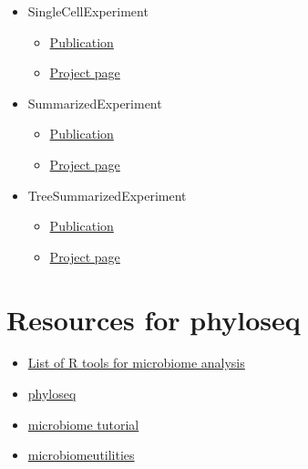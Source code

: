 \documentclass[
  oneside]{book}
\providecommand{\tightlist}{%
  \setlength{\itemsep}{0pt}\setlength{\parskip}{0pt}}
\begin{document}
\begin{itemize}
\tightlist
\item
  SingleCellExperiment

  \begin{itemize}
  \tightlist
  \item
    \href{https://bioconductor.org/packages/release/bioc/vignettes/SingleCellExperiment/inst/doc/intro.html}{Publication}
  \item
    \href{https://bioconductor.org/packages/release/bioc/html/SingleCellExperiment.html}{Project page}
  \end{itemize}
\item
  SummarizedExperiment

  \begin{itemize}
  \tightlist
  \item
    \href{https://bioconductor.org/packages/release/bioc/vignettes/SummarizedExperiment/inst/doc/SummarizedExperiment.html}{Publication}
  \item
    \href{https://bioconductor.org/packages/release/bioc/html/SummarizedExperiment.html}{Project page}
  \end{itemize}
\item
  TreeSummarizedExperiment

  \begin{itemize}
  \tightlist
  \item
    \href{https://f1000research.com/articles/9-1246}{Publication}
  \item
    \href{https://www.bioconductor.org/packages/release/bioc/html/TreeSummarizedExperiment.html}{Project page}
  \end{itemize}
\end{itemize}

\hypertarget{resources-for-phyloseq}{%
\section{Resources for phyloseq}\label{resources-for-phyloseq}}

\begin{itemize}
\tightlist
\item
  \href{https://microsud.github.io/Tools-Microbiome-Analysis/}{List of R tools for microbiome analysis}
\item
  \href{http://journals.plos.org/plosone/article?id=10.1371/journal.pone.0061217}{phyloseq}
\item
  \href{http://microbiome.github.io/tutorials/}{microbiome tutorial}
\item
  \href{https://microsud.github.io/microbiomeutilities/}{microbiomeutilities}
\end{itemize}
\end{document}
